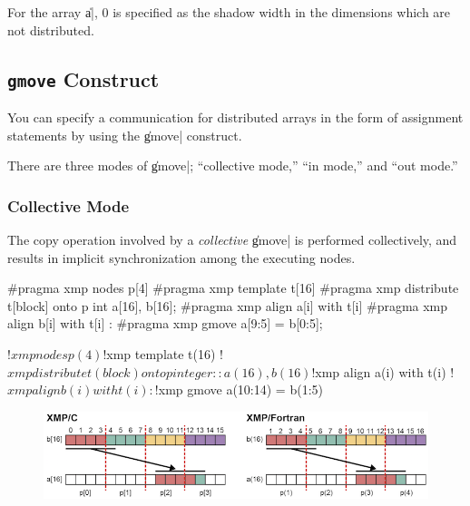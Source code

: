 For the array \|a|, 0 is specified as the shadow width in the dimensions
which are not distributed.


\subsection{{\tt gmove} Construct}

You can specify a communication for distributed arrays in the form of
assignment statements by using the \|gmove| construct.

There are three modes of \|gmove|; ``collective mode,'' ``in mode,'' and
``out mode.''

\subsubsection{Collective Mode}



The copy operation involved by a {\it collective} \|gmove| is performed
collectively, and results in implicit synchronization among the 
executing nodes.

\begin{XCexample}
#pragma xmp nodes p[4]
#pragma xmp template t[16]
#pragma xmp distribute t[block] onto p
int a[16], b[16];
#pragma xmp align a[i] with t[i]
#pragma xmp align b[i] with t[i]
     :
#pragma xmp gmove
  a[9:5] = b[0:5];
\end{XCexample}

\begin{XFexample}
!$xmp nodes p(4)
!$xmp template t(16)
!$xmp distribute t(block) onto p
integer :: a(16), b(16)
!$xmp align a(i) with t(i)
!$xmp align b(i) with t(i)
     :
!$xmp gmove
  a(10:14) = b(1:5)
\end{XFexample}

\begin{figure}
  \centering
  \includegraphics[width=\textwidth]{figs/gmove.png}
\end{figure}

